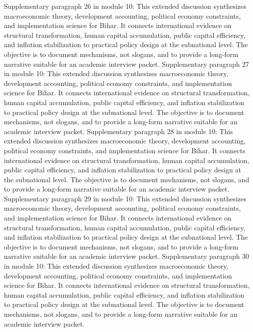 \documentclass[preprint,12pt]{elsarticle}
\begin{document}
Supplementary paragraph 26 in module 10: This extended discussion synthesizes macroeconomic theory, development accounting, political economy constraints, and implementation science for Bihar. It connects international evidence on structural transformation, human capital accumulation, public capital efficiency, and inflation stabilization to practical policy design at the subnational level. The objective is to document mechanisms, not slogans, and to provide a long-form narrative suitable for an academic interview packet.
Supplementary paragraph 27 in module 10: This extended discussion synthesizes macroeconomic theory, development accounting, political economy constraints, and implementation science for Bihar. It connects international evidence on structural transformation, human capital accumulation, public capital efficiency, and inflation stabilization to practical policy design at the subnational level. The objective is to document mechanisms, not slogans, and to provide a long-form narrative suitable for an academic interview packet.
Supplementary paragraph 28 in module 10: This extended discussion synthesizes macroeconomic theory, development accounting, political economy constraints, and implementation science for Bihar. It connects international evidence on structural transformation, human capital accumulation, public capital efficiency, and inflation stabilization to practical policy design at the subnational level. The objective is to document mechanisms, not slogans, and to provide a long-form narrative suitable for an academic interview packet.
Supplementary paragraph 29 in module 10: This extended discussion synthesizes macroeconomic theory, development accounting, political economy constraints, and implementation science for Bihar. It connects international evidence on structural transformation, human capital accumulation, public capital efficiency, and inflation stabilization to practical policy design at the subnational level. The objective is to document mechanisms, not slogans, and to provide a long-form narrative suitable for an academic interview packet.
Supplementary paragraph 30 in module 10: This extended discussion synthesizes macroeconomic theory, development accounting, political economy constraints, and implementation science for Bihar. It connects international evidence on structural transformation, human capital accumulation, public capital efficiency, and inflation stabilization to practical policy design at the subnational level. The objective is to document mechanisms, not slogans, and to provide a long-form narrative suitable for an academic interview packet.
\end{document}
